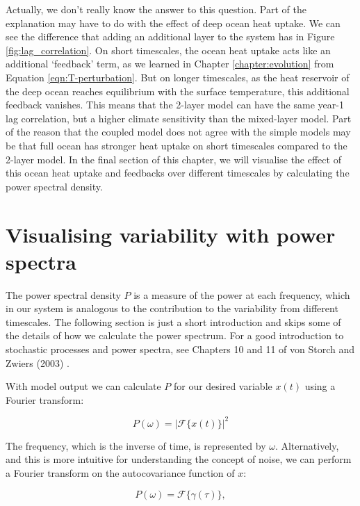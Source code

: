 \documentclass[12pt]{book}
\begin{document}
Actually, we don't really know the answer to this question. Part of the explanation may have  to do with the effect of deep ocean heat uptake.  We can see the difference that adding an additional layer to the system has in Figure \ref{fig:lag_correlation}. On short timescales, the ocean heat uptake acts like an additional `feedback' term, as we learned in Chapter \ref{chapter:evolution} from Equation \ref{eqn:T-perturbation}. But on longer timescales, as the heat reservoir of the deep ocean reaches equilibrium with the surface temperature, this additional feedback vanishes. This means that the 2-layer model can have the same year-1 lag correlation, but a higher climate sensitivity than the mixed-layer model. Part of the reason that the coupled model does not agree with the simple models may be that full ocean has stronger heat uptake on short timescales compared to the 2-layer model. In the final section of this chapter, we will visualise the effect of this ocean heat uptake and feedbacks over different timescales by calculating the power spectral density.

\section{Visualising variability with power spectra}
The power spectral density $P$ is a measure of the power at each frequency, which in our system is analogous to the contribution to the variability from different timescales. The following section is just a short introduction and skips some of the details of how we calculate the power spectrum. For a good introduction to stochastic processes and power spectra, see Chapters 10 and 11 of von Storch and Zwiers (2003) \cite{VonStorch2003}.

With model output we can calculate $P$ for our desired variable $x(t)$ using a Fourier transform:

\begin{equation}
P(\omega) = \left | \mathcal{F}\{x(t)\}\right | ^{2}
\label{eqn_four1}
\end{equation}

The frequency, which is the inverse of time, is represented by $\omega$. Alternatively, and this is more intuitive for understanding the concept of noise, we can perform a Fourier transform on the autocovariance function of $x$:

\begin{equation}
P(\omega) = \mathcal{F}\{\gamma(\tau)\} ,
\label{eqn_fou}
\end{equation}
\end{document}
